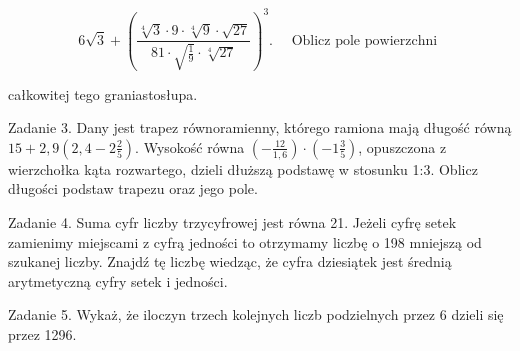 \documentclass[10pt]{article}
\begin{document}
\[
6 \sqrt{3}+\left(\frac{\sqrt[4]{3} \cdot 9 \cdot \sqrt[4]{9} \cdot \sqrt{27}}{81 \cdot \sqrt{\frac{1}{9}} \cdot \sqrt[4]{27}}\right)^{3} . \quad \text { Oblicz pole powierzchni }
\]

całkowitej tego graniastosłupa.

Zadanie 3. Dany jest trapez równoramienny, którego ramiona mają długość równą \(15+2,9\left(2,4-2 \frac{2}{5}\right)\). Wysokość równa \(\left(-\frac{12}{1,6}\right) \cdot\left(-1 \frac{3}{5}\right)\), opuszczona z wierzchołka kąta rozwartego, dzieli dłuższą podstawę w stosunku 1:3. Oblicz długości podstaw trapezu oraz jego pole.

Zadanie 4. Suma cyfr liczby trzycyfrowej jest równa 21. Jeżeli cyfrę setek zamienimy miejscami z cyfrą jedności to otrzymamy liczbę o 198 mniejszą od szukanej liczby. Znajdź tę liczbę wiedząc, że cyfra dziesiątek jest średnią arytmetyczną cyfry setek i jedności.

Zadanie 5. Wykaż, że iloczyn trzech kolejnych liczb podzielnych przez 6 dzieli się przez 1296.
\end{document}
